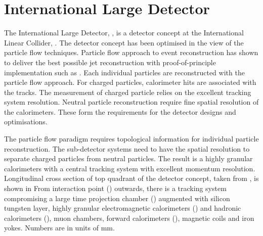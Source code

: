 \section{International Large Detector}


The International Large Detector, \ILD, is a detector concept at the International Linear Collider, \ILC. The \ILD detector concept has been optimised in the view of the particle flow techniques. Particle flow approach to event reconstruction has shown to deliver the best possible jet reconstruction with proof-of-principle implementation such as . Each individual particles are reconstructed with the particle flow approach. For charged particles, calorimeter hits are associated with the tracks. The measurement of charged particle relies on the excellent tracking system resolution. Neutral particle reconstruction require fine spatial resolution of the calorimeters. These form the requirements for the detector designs and optimisations.


The particle flow paradigm requires topological information for individual particle reconstruction. The sub-detector systems need to have the spatial resolution to separate charged particles from neutral particles. The result is a highly granular calorimeters with a central tracking system with excellent momentum resolution. Longitudinal cross section of top quadrant of the \ILD detector concept, taken from \cite{Behnke:2007gj}, is shown in  From interaction point (\IP) outwards, there is a tracking system compromising a large time projection chamber (\TPC) augmented with silicon tungsten layer, highly granular electromagnetic calorimeters (\ECAL) and hadronic calorimeters (\HCAL), muon chambers, forward calorimeters (\FCAL), magnetic coils and iron yokes. Numbers are in units of mm.

